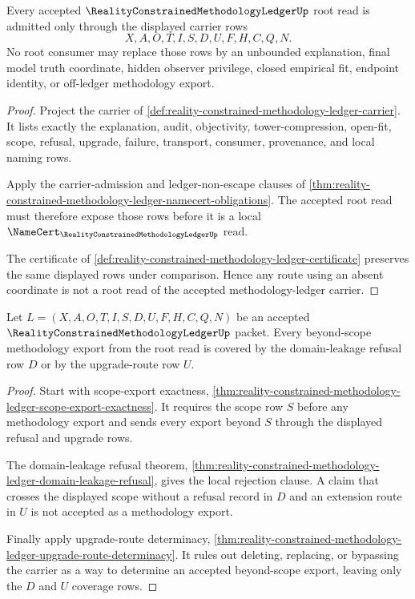 \begin{theorem}
\label{thm:reality-constrained-methodology-ledger-root-scope-carrier-admission}
Every accepted $\RealityConstrainedMethodologyLedgerUp$ root read is admitted only through the displayed carrier rows
$$
X,A,O,T,I,S,D,U,F,H,C,Q,N.
$$
No root consumer may replace those rows by an unbounded explanation, final model truth coordinate, hidden observer privilege, closed empirical fit, endpoint identity, or off-ledger methodology export.
\end{theorem}
\begin{proof}
Project the carrier of \autoref{def:reality-constrained-methodology-ledger-carrier}. It lists exactly the explanation, audit, objectivity, tower-compression, open-fit, scope, refusal, upgrade, failure, transport, consumer, provenance, and local naming rows.

Apply the carrier-admission and ledger-non-escape clauses of \autoref{thm:reality-constrained-methodology-ledger-namecert-obligations}. The accepted root read must therefore expose those rows before it is a local $\NameCert_{\RealityConstrainedMethodologyLedgerUp}$ read.

The certificate of \autoref{def:reality-constrained-methodology-ledger-certificate} preserves the same displayed rows under comparison. Hence any route using an absent coordinate is not a root read of the accepted methodology-ledger carrier.
\end{proof}

\begin{theorem}
\label{thm:reality-constrained-methodology-ledger-root-refusal-upgrade-coverage}
Let $L=(X,A,O,T,I,S,D,U,F,H,C,Q,N)$ be an accepted $\RealityConstrainedMethodologyLedgerUp$ packet. Every beyond-scope methodology export from the root read is covered by the domain-leakage refusal row $D$ or by the upgrade-route row $U$.
\end{theorem}
\begin{proof}
Start with scope-export exactness, \autoref{thm:reality-constrained-methodology-ledger-scope-export-exactness}. It requires the scope row $S$ before any methodology export and sends every export beyond $S$ through the displayed refusal and upgrade rows.

The domain-leakage refusal theorem, \autoref{thm:reality-constrained-methodology-ledger-domain-leakage-refusal}, gives the local rejection clause. A claim that crosses the displayed scope without a refusal record in $D$ and an extension route in $U$ is not accepted as a methodology export.

Finally apply upgrade-route determinacy, \autoref{thm:reality-constrained-methodology-ledger-upgrade-route-determinacy}. It rules out deleting, replacing, or bypassing the carrier as a way to determine an accepted beyond-scope export, leaving only the $D$ and $U$ coverage rows.
\end{proof}

